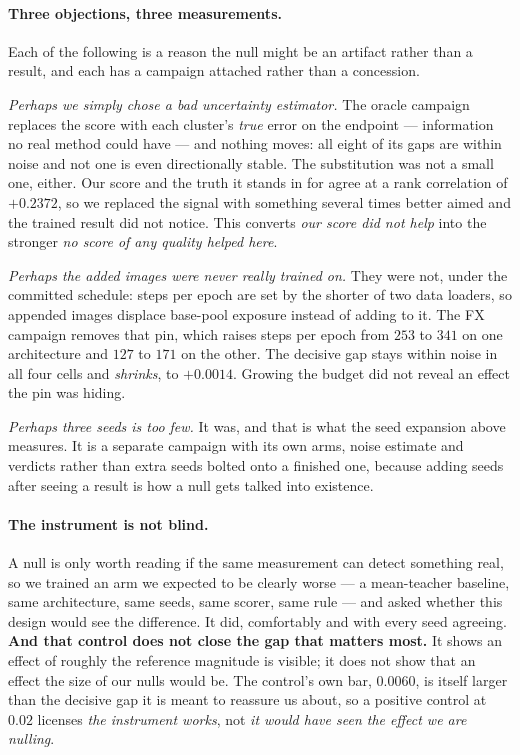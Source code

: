 \documentclass{article} %
\begin{document}
\paragraph{Three objections, three measurements.} Each of the following is a reason the null might
be an artifact rather than a result, and each has a campaign attached rather than a concession.

\emph{Perhaps we simply chose a bad uncertainty estimator.} The oracle campaign replaces the score
with each cluster's \emph{true} error on the endpoint --- information no real method could have ---
and nothing moves: all eight of its gaps are within noise and not one is even directionally stable.
The substitution was not a small one, either. Our score and the truth it stands in for agree at a
rank correlation of $+0.2372$, so we replaced the signal with something several times better aimed
and the trained result did not notice. This converts \emph{our score did not help} into the stronger
\emph{no score of any quality helped here}.

\emph{Perhaps the added images were never really trained on.} They were not, under the committed
schedule: steps per epoch are set by the shorter of two data loaders, so appended images displace
base-pool exposure instead of adding to it. The FX campaign removes that pin, which raises steps per
epoch from $253$ to $341$ on one architecture and $127$ to $171$ on the other. The decisive gap
stays within noise in all four cells and \emph{shrinks}, to $+0.0014$. Growing the budget did not
reveal an effect the pin was hiding.

\emph{Perhaps three seeds is too few.} It was, and that is what the seed expansion above measures.
It is a separate campaign with its own arms, noise estimate and verdicts rather than extra seeds
bolted onto a finished one, because adding seeds after seeing a result is how a null gets talked
into existence.

\paragraph{The instrument is not blind.} A null is only worth reading if the same measurement can
detect something real, so we trained an arm we expected to be clearly worse --- a mean-teacher
baseline, same architecture, same seeds, same scorer, same rule --- and asked whether this design
would see the difference. It did, comfortably and with every seed agreeing.
\textbf{And that control does not close the gap that matters most.} It shows an effect of roughly
the reference magnitude is visible; it does not show that an effect the size of our nulls would be.
The control's own bar, $0.0060$, is itself larger than the decisive gap it is meant to reassure us
about, so a positive control at $0.02$ licenses \emph{the instrument works}, not \emph{it would have
seen the effect we are nulling}.
\end{document}
